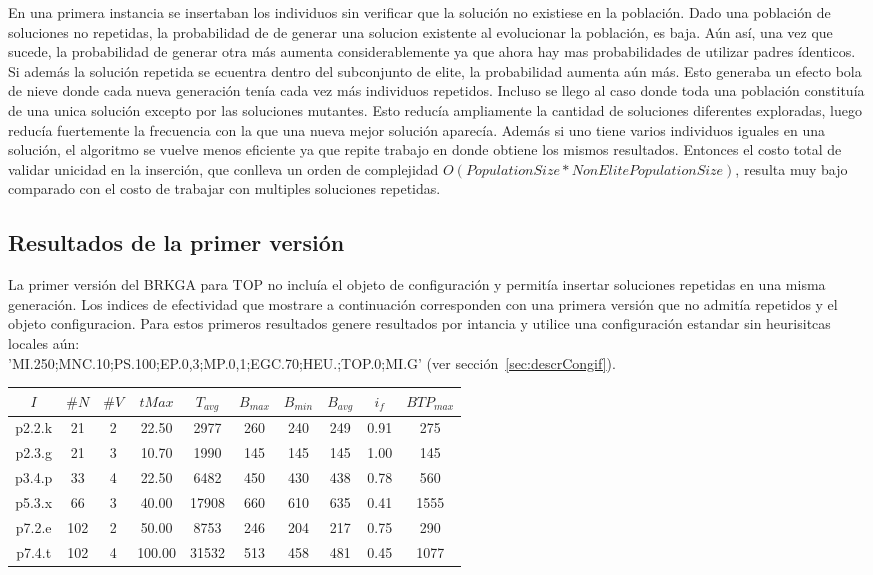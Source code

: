 En una primera instancia se insertaban los individuos sin verificar que la solución no existiese en la población. Dado una población de soluciones no repetidas, la probabilidad de de generar una solucion existente al evolucionar la población, es baja. Aún así, una vez que sucede, la probabilidad de generar otra más aumenta considerablemente ya que ahora hay mas probabilidades de utilizar padres ídenticos. Si además la solución repetida se ecuentra dentro del subconjunto de elite, la probabilidad aumenta aún más. Esto generaba un efecto bola de nieve donde cada nueva generación tenía cada vez más individuos repetidos. Incluso se llego al caso donde toda una población constituía de una unica solución excepto por las soluciones mutantes. Esto reducía ampliamente la cantidad de soluciones diferentes exploradas, luego reducía fuertemente la frecuencia con la que una nueva mejor solución aparecía. Además si uno tiene varios individuos iguales en una solución, el algoritmo se vuelve menos eficiente ya que repite trabajo en donde obtiene los mismos resultados. Entonces el costo total de validar unicidad en la inserción, que conlleva un orden de complejidad $O(PopulationSize * NonElitePopulationSize)$, resulta muy bajo comparado con el costo de trabajar con multiples soluciones repetidas.

\subsection{Resultados de la primer versión}

La primer versión del BRKGA para TOP no incluía el objeto de configuración y permitía insertar soluciones repetidas en una misma generación. Los indices de efectividad que mostrare a continuación corresponden con una primera versión que no admitía repetidos y el objeto configuracion. Para estos primeros resultados genere resultados por intancia y utilice una configuración estandar sin heurisitcas locales aún:\\ 'MI.250;MNC.10;PS.100;EP.0,3;MP.0,1;EGC.70;HEU.;TOP.0;MI.G' (ver sección~\ref{sec:descrCongif}).

\bigskip

\begin{center}
\begin{tabular}{ |c|c|c|c|c|c|c|c|c|c| } 
 \hline
$I$ & $\#N$ & $\#V$ & $tMax$ & $T_{avg}$ & $B_{max}$ & $B_{min}$ & $B_{avg}$ & $i_{f}$ & $BTP_{max}$ \\
\hline
p2.2.k & 21 & 2 & 22.50 & 2977 & 260 & 240 & 249 & 0.91 & 275  \\
p2.3.g & 21 & 3 & 10.70 & 1990 & 145 & 145 & 145 & 1.00 & 145  \\
p3.4.p & 33 & 4 & 22.50 & 6482 & 450 & 430 & 438 & 0.78 & 560  \\
p5.3.x & 66 & 3 & 40.00 & 17908 & 660 & 610 & 635 & 0.41 & 1555  \\
p7.2.e & 102 & 2 & 50.00 & 8753 & 246 & 204 & 217 & 0.75 & 290  \\
p7.4.t & 102 & 4 & 100.00 & 31532 & 513 & 458 & 481 & 0.45 & 1077  \\
\hline
\end{tabular}
\end{center}

